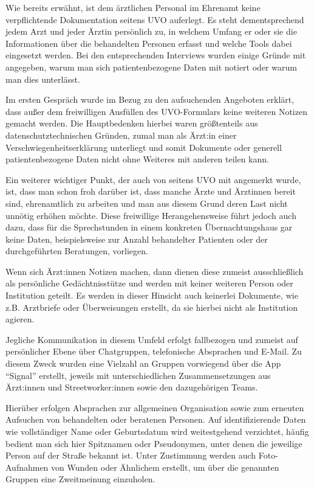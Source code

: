 Wie bereits erwähnt, ist dem ärztlichen Personal im Ehrenamt keine verpflichtende Dokumentation seitens UVO auferlegt. Es steht dementsprechend jedem Arzt und jeder Ärztin persönlich zu, in welchem Umfang er oder sie die Informationen über die behandelten Personen erfasst und welche Tools dabei eingesetzt werden. Bei den entsprechenden Interviews wurden einige Gründe mit angegeben, warum man sich patientenbezogene Daten mit notiert oder warum man dies unterlässt.

Im ersten Gespräch wurde im Bezug zu den aufsuchenden Angeboten erklärt, dass außer dem freiwilligen Ausfüllen des UVO-Formulars keine weiteren Notizen gemacht werden. Die Hauptbedenken hierbei waren größtenteils aus datenschutztechnischen Gründen, zumal man als Ärzt:in einer Verschwiegenheitserklärung unterliegt und somit Dokumente oder generell patientenbezogene Daten nicht ohne Weiteres mit anderen teilen kann.

Ein weiterer wichtiger Punkt, der auch von seitens UVO mit angemerkt wurde, ist, dass man schon froh darüber ist, dass manche Ärzte und Ärztinnen bereit sind, ehrenamtlich zu arbeiten und man aus diesem Grund deren Last nicht unnötig erhöhen möchte. Diese freiwillige Herangehensweise führt jedoch auch dazu, dass für die Sprechstunden in einem konkreten Übernachtungshaus gar keine Daten, beispielsweise zur Anzahl behandelter Patienten oder der durchgeführten Beratungen, vorliegen.

Wenn sich Ärzt:innen Notizen machen, dann dienen diese zumeist ausschließlich als persönliche Gedächtnisstütze und werden mit keiner weiteren Person oder Institution geteilt. Es werden in dieser Hinsicht auch keinerlei Dokumente, wie z.B. Arztbriefe oder Überweisungen erstellt, da sie hierbei nicht als Institution agieren.

Jegliche Kommunikation in diesem Umfeld erfolgt fallbezogen und zumeist auf persönlicher Ebene über Chatgruppen, telefonische Absprachen und E-Mail. Zu diesem Zweck wurden eine Vielzahl an Gruppen vorwiegend über die App \enquote{Signal} erstellt, jeweils mit unterschiedlichen Zusammensetzungen aus Ärzt:innen und Streetworker:innen sowie den dazugehörigen Teams.

Hierüber erfolgen Absprachen zur allgemeinen Organisation sowie zum erneuten Aufsuchen von behandelten oder beratenen Personen. Auf identifizierende Daten wie vollständiger Name oder Geburtsdatum wird weitestgehend verzichtet, häufig bedient man sich hier Spitznamen oder Pseudonymen, unter denen die jeweilige Person auf der Straße bekannt ist. Unter Zustimmung werden auch Foto-Aufnahmen von Wunden oder Ähnlichem erstellt, um über die genannten Gruppen eine Zweitmeinung einzuholen.

